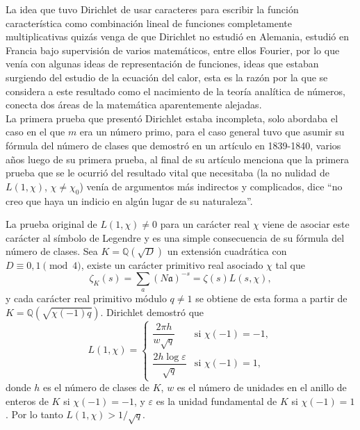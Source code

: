 La idea que tuvo Dirichlet de usar caracteres para escribir la función característica como combinación lineal de funciones completamente multiplicativas quizás venga de que Dirichlet no estudió en Alemania, estudió en Francia bajo supervisión de varios matemáticos, entre ellos Fourier, por lo que venía con algunas ideas de representación de funciones, ideas que estaban surgiendo del estudio de la ecuación del calor, esta es la razón por la que se considera a este resultado como el nacimiento de la teoría analítica de números, conecta dos áreas de la matemática aparentemente alejadas.\\

La primera prueba que presentó Dirichlet estaba incompleta, solo abordaba el caso en el que $m$ era un número primo, para el caso general tuvo que asumir su fórmula del número de clases que demostró en un artículo en 1839-1840, varios años luego de su primera prueba, al final de su artículo menciona que la primera prueba que se le ocurrió del resultado vital que necesitaba (la no nulidad de $L(1,\chi)$, $\chi\neq\chi_0$) venía de  argumentos más indirectos y complicados, dice ``no creo que haya un indicio en algún lugar de su naturaleza''.\\

\begin{note}
La prueba original de \(L(1, \chi) \neq 0\) para un carácter real \(\chi\) viene de asociar este carácter al símbolo de Legendre y es una simple consecuencia de su fórmula del número de clases. Sea \(K = \mathbb{Q}(\sqrt{D})\) un extensión cuadrática con \(D \equiv 0, 1 \pmod{4}\), existe un carácter primitivo real asociado \(\chi\) tal que
\[
\zeta_K(s) = \sum_a (N\mathfrak{a})^{-s} = \zeta(s)L(s, \chi),
\]
y cada carácter real primitivo módulo \( q \neq 1 \) se obtiene de esta forma a partir de \( K = \mathbb{Q}(\sqrt{\chi(-1)q}) \). Dirichlet demostró que
\[
L(1, \chi) = 
\begin{cases}
\dfrac{2\pi h}{w \sqrt{q}} & \text{si } \chi(-1) = -1, \\[8pt]
\dfrac{2h \log \varepsilon}{\sqrt{q}} & \text{si } \chi(-1) = 1,
\end{cases}
\]
donde \(h\) es el número de clases de \(K\), \(w\) es el número de unidades en el anillo de enteros de \(K\) si \(\chi(-1) = -1\), y \(\varepsilon\) es la unidad fundamental de \(K\) si \(\chi(-1) = 1\). Por lo tanto $L(1, \chi) > 1/\sqrt{q}$.\quad \cite{iwaniec2021analytic}\\
\end{note}

